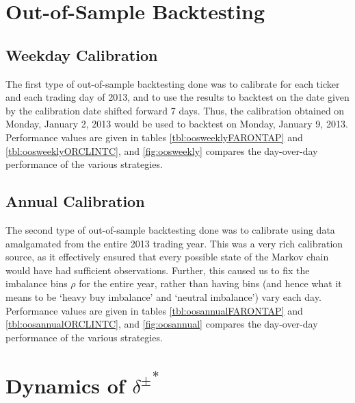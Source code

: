 \section{Out-of-Sample Backtesting}
\subsection{Weekday Calibration}
The first type of out-of-sample backtesting done was to calibrate for each ticker and each trading day of 2013, and to use the results to backtest on the date given by the calibration date shifted forward 7 days. Thus, the calibration obtained on Monday, January 2, 2013 would be used to backtest on Monday, January 9, 2013. Performance values are given in tables \autoref{tbl:oosweeklyFARONTAP} and \autoref{tbl:oosweeklyORCLINTC}, and \autoref{fig:oosweekly} compares the day-over-day performance of the various strategies. 


\subsection{Annual Calibration}
The second type of out-of-sample backtesting done was to calibrate using data amalgamated from the entire 2013 trading year. This was a very rich calibration source, as it effectively ensured that every possible state of the Markov chain would have had sufficient observations. Further, this caused us to fix the imbalance bins $\rho$ for the entire year, rather than having bins (and hence what it means to be `heavy buy imbalance' and `neutral imbalance') vary each day. Performance values are given in tables \autoref{tbl:oosannualFARONTAP} and \autoref{tbl:oosannualORCLINTC}, and \autoref{fig:oosannual} compares the day-over-day performance of the various strategies. 


\section{Dynamics of \texorpdfstring{${\delta^{\pm}}^*$}{delta}}


